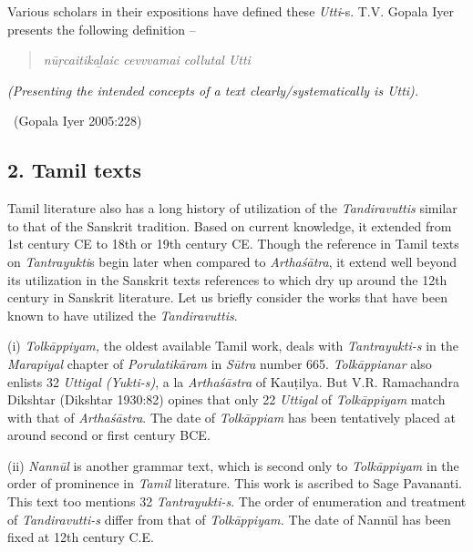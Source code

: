 Various scholars in their expositions have defined these \textit{Utti}-s. T.V. Gopala Iyer presents the following definition –

\begin{verse}
\textit{nūṛcaitikaḻaic cevvvamai collutal Utti}
\end{verse}

\begin{myquote}
\textit{(Presenting the intended concepts of a text clearly/systematically is Utti).}

~\hfill (Gopala Iyer 2005:228)
\end{myquote}


\subsection*{2. Tamil texts}

Tamil literature also has a long history of utilization of the \textit{Tandiravuttis} similar to that of the Sanskrit tradition. Based on current knowledge, it extended from 1st century CE to 18th or 19th century CE. Though the reference in Tamil texts on \textit{Tantrayukti}s begin later when compared to \textit{Arthaśātra}, it extend well beyond its utilization in the Sanskrit texts references to which dry up around the 12th century in Sanskrit literature. Let us briefly consider the works that have been known to have utilized the \textit{Tandiravuttis}.

(i) \textit{Tolkāppiyam,} the oldest available Tamil work, deals with \textit{Tantrayukti-s} in the \textit{Marapiyal} chapter of \textit{Porulatikāram} in \textit{Sūtra} number 665. \textit{Tolkāppianar} also enlists 32 \textit{Uttigal (Yukti-s)}, a la \textit{Arthaśāstra} of Kauṭilya. But V.R. Ramachandra Dikshtar (Dikshtar 1930:82) opines that only 22 \textit{Uttigal} of \textit{Tolkāppiyam} match with that of \textit{Arthaśāstra}. The date of \textit{Tolkāppiam} has been tentatively placed at around second or first century BCE.

\newpage

(ii) \textit{Nannūl} is another grammar text, which is second only to \textit{Tolkāppiyam} in the order of prominence in \textit{Tamil} literature. This work is ascribed to Sage Pavananti. This text too mentions 32 \textit{Tantrayukti-s}. The order of enumeration and treatment of \textit{Tandiravutti-s } differ from that of \textit{Tolkāppiyam.} The date of Nannūl has been fixed at 12th century C.E.

